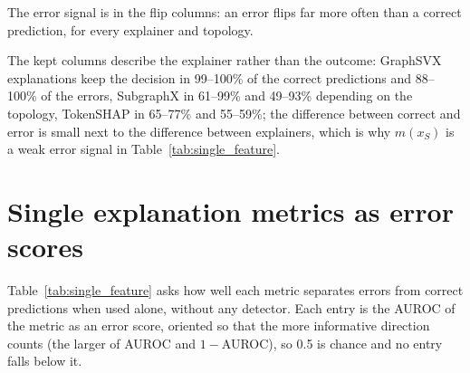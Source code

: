 \documentclass[3p,times,10pt,nopreprintline]{elsarticle}
\begin{document}
The error signal is in the flip columns: an error flips far more often than a correct prediction, for every explainer and topology.

The kept columns describe the explainer rather than the outcome: GraphSVX explanations keep the decision in 99--100\% of the correct predictions and 88--100\% of the errors, SubgraphX in 61--99\% and 49--93\% depending on the topology, TokenSHAP in 65--77\% and 55--59\%; the difference between correct and error is small next to the difference between explainers, which is why \(m(x_S)\) is a weak error signal in Table~\ref{tab:single_feature}.

\begin{table}[H]
\centering
\scriptsize
\setlength{\tabcolsep}{3pt}
\caption{Dimension 3 read as decisions, by explainer, graph type and correctness of the prediction (gold label). Flip: percentage of instances whose decision changes when the explanation is removed (\(m(x_{\setminus S})<0\)). Kept: percentage whose decision is reproduced by the explanation alone (\(m(x_S)>0\)). Fine-tuned node features, 20\% budget.}
\label{tab:margin_flips}
\end{table}

\section{Single explanation metrics as error scores}

Table~\ref{tab:single_feature} asks how well each metric separates errors from correct predictions when used alone, without any detector. Each entry is the AUROC of the metric as an error score, oriented so that the more informative direction counts (the larger of AUROC and \(1-\)AUROC), so 0.5 is chance and no entry falls below it.
\end{document}
